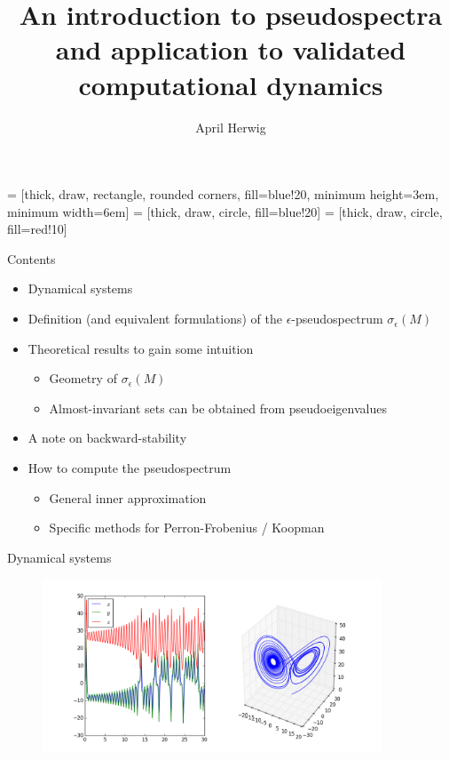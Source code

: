 \documentclass[
  english,            %
  aspectratio=169,    %
]{tumbeamer}
\title{An introduction to pseudospectra and application to validated computational dynamics}
\author{April Herwig}
\institute{\theChairName\\\theDepartmentName\\\theUniversityName}
\date{}
\begin{document}
 = [thick, draw, rectangle, rounded corners, fill=blue!20,
                       minimum height=3em, minimum width=6em]
 = [thick, draw, circle, fill=blue!20]
 = [thick, draw, circle, fill=red!10]

\maketitle

\begin{frame}{Contents}
  
\begin{itemize}
  \item Dynamical systems
  \item Definition (and equivalent formulations) of the $\epsilon$-pseudospectrum $\sigma_\epsilon (M)$
  \item Theoretical results to gain some intuition
  \begin{itemize}
    \item Geometry of $\sigma_\epsilon (M)$
    \item Almost-invariant sets can be obtained from pseudoeigenvalues
  \end{itemize}
  \item A note on backward-stability
  \item How to compute the pseudospectrum
  \begin{itemize}
    \item General inner approximation
    \item Specific methods for Perron-Frobenius / Koopman
  \end{itemize}
\end{itemize}

\end{frame}

\begin{frame}{Dynamical systems}
  
\begin{figure}
  \centering
  \includegraphics[width=0.9\textwidth]{lorenz_matplotlib.png}
\end{figure}

\end{frame}
\end{document}
